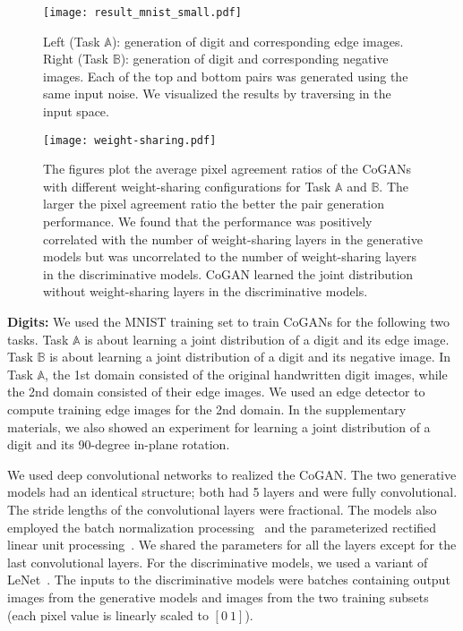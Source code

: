 \documentclass{article}
\begin{document}
\begin{figure}[t]
\centering
\texttt{[image: result\_mnist\_small.pdf]}
\caption{\small Left (Task $\mathbb{A}$): generation of digit and corresponding edge images. Right (Task $\mathbb{B}$): generation of digit and corresponding negative images. Each of the top and bottom pairs was generated using the same input noise. We visualized the results by traversing in the input space.}
\label{fig::result_mnist}
\centering
\texttt{[image: weight-sharing.pdf]}
\caption{\small The figures plot the average pixel agreement ratios of the CoGANs with different weight-sharing configurations for Task $\mathbb{A}$ and $\mathbb{B}$. The larger the pixel agreement ratio the better the pair generation performance. We found that the performance was positively correlated with the number of weight-sharing layers in the generative models but was uncorrelated to the number of weight-sharing layers in the discriminative models. CoGAN learned the joint distribution without weight-sharing layers in the discriminative models.}
\label{fig::quantitative_digit}
\vspace{-2mm}
\end{figure}

{\bf Digits:} We used the MNIST training set to train CoGANs for the following two tasks. Task $\mathbb{A}$ is about learning a joint distribution of a digit and its edge image. Task $\mathbb{B}$ is about learning a joint distribution of a digit and its negative image. In Task $\mathbb{A}$, the 1st domain consisted of the original handwritten digit images, while the 2nd domain consisted of their edge images. We used an edge detector to compute training edge images for the 2nd domain. In the supplementary materials, we also showed an experiment for learning a joint distribution of a digit and its 90-degree in-plane rotation.

We used deep convolutional networks to realized the CoGAN. The two generative models had an identical structure; both had 5 layers and were fully convolutional. The stride lengths of the convolutional layers were fractional. The models also employed the batch normalization processing~\cite{ioffe2015batch} and the parameterized rectified linear unit processing~\cite{he2015delving}. We shared the parameters for all the layers except for the last convolutional layers. For the discriminative models, we used a variant of LeNet~\cite{lecun1998gradient}. The inputs to the discriminative models were batches containing output images from the generative models and images from the two training subsets (each pixel value is linearly scaled to $[0\medspace1]$). 
\end{document}
